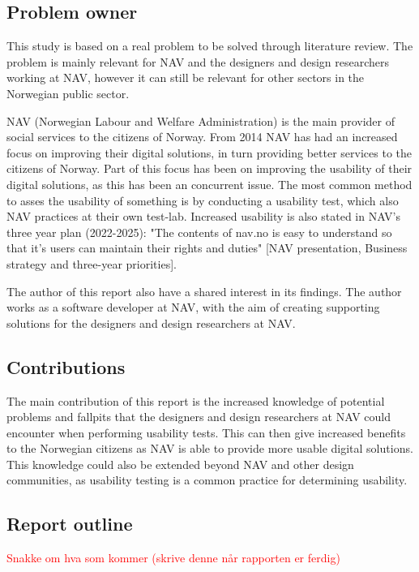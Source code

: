 \subsection{Problem owner}
This study is based on a real problem to be solved through literature review. The problem is mainly relevant for NAV and the designers and design researchers working at NAV, however it can still be relevant for other sectors in the Norwegian public sector.

NAV (Norwegian Labour and Welfare Administration) is the main provider of social services to the citizens of Norway. From 2014 NAV has had an increased focus on improving their digital solutions, in turn providing better services to the citizens of Norway. Part of this focus has been on improving the usability of their digital solutions, as this has been an concurrent issue. The most common method to asses the usability of something is by conducting a usability test, which also NAV practices at their own test-lab. Increased usability is also stated in NAV's three year plan (2022-2025): "The contents of nav.no is easy to understand so that it's users can maintain their rights and duties" [NAV presentation, Business strategy and three-year priorities].

The author of this report also have a shared interest in its findings. The author works as a software developer at NAV, with the aim of creating supporting solutions for the designers and design researchers at NAV.

\subsection{Contributions}
The main contribution of this report is the increased knowledge of potential problems and fallpits that the designers and design researchers at NAV could encounter when performing usability tests. This can then give increased benefits to the Norwegian citizens as NAV is able to provide more usable digital solutions. This knowledge could also be extended beyond NAV and other design communities, as usability testing is a common practice for determining usability.

\subsection{Report outline}

\textcolor{red}{Snakke om hva som kommer (skrive denne når rapporten er ferdig) }